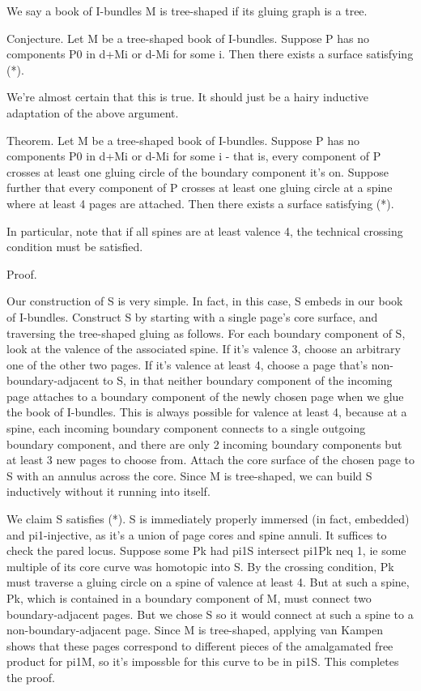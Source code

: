 \documentclass[12pt]{amsart}
\theoremstyle{definition}
\begin{document}
We say a book of I-bundles M is tree-shaped if its gluing graph is a tree.

Conjecture. Let M be a tree-shaped book of I-bundles. Suppose P has no
components P0 in d+Mi or d-Mi for some i. Then there exists a surface
satisfying (*).

We're almost certain that this is true. It should just be a hairy inductive
adaptation of the above argument.

Theorem. Let M be a tree-shaped book of I-bundles. Suppose P has no components
P0 in d+Mi or d-Mi for some i - that is, every component of P crosses at least
one gluing circle of the boundary component it's on. Suppose further that every
component of P crosses at least one gluing circle at a spine where at least
4 pages are attached. Then there exists a surface satisfying (*).

In particular, note that if all spines are at least valence 4, the technical
crossing condition must be satisfied.

Proof.

Our construction of S is very simple. In fact, in this case, S embeds in our
book of I-bundles. Construct S by starting with a single page's core surface,
and traversing the tree-shaped gluing as follows. For each boundary component
of S, look at the valence of the associated spine. If it's valence 3, choose an
arbitrary one of the other two pages. If it's valence at least 4, choose a page
that's non-boundary-adjacent to S, in that neither boundary component of the
incoming page attaches to a boundary component of the newly chosen page when we
glue the book of I-bundles. This is always possible for valence at least 4,
because at a spine, each incoming boundary component connects to a single
outgoing boundary component, and there are only 2 incoming boundary components
but at least 3 new pages to choose from. Attach the core surface of the chosen
page to S with an annulus across the core. Since M is tree-shaped, we can build
S inductively without it running into itself.

We claim S satisfies (*). S is immediately properly immersed (in fact,
embedded) and pi1-injective, as it's a union of page cores and spine annuli. It
suffices to check the pared locus. Suppose some Pk had pi1S intersect pi1Pk neq
1, ie some multiple of its core curve was homotopic into S. By the crossing
condition, Pk must traverse a gluing circle on a spine of valence at least 4.
But at such a spine, Pk, which is contained in a boundary component of M, must
connect two boundary-adjacent pages. But we chose S so it would
connect at such a spine to a non-boundary-adjacent page. Since M is
tree-shaped, applying van Kampen shows that these pages correspond to
different pieces of the amalgamated free product for pi1M, so it's impossble
for this curve to be in pi1S. This completes the proof.
\end{document}
